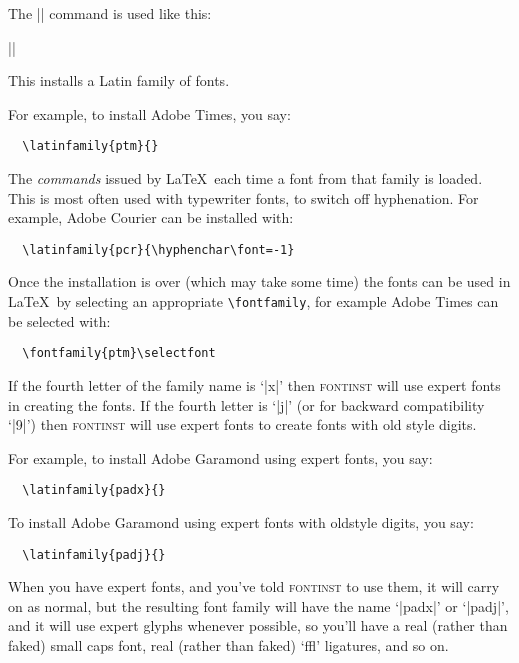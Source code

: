 \documentclass[a4paper]{ltxguide}
\newcommand*{\setpackagename}[1]{\textsc{#1}}
\newcommand{\fontinst}{\setpackagename{font\-inst}\xspace}
\begin{document}

The |\latinfamily| command is used like this:
\begin{decl}
  |\latinfamily|
\end{decl}
This installs a Latin family of fonts.

For example, to install Adobe Times, you say:
\begin{verbatim}
  \latinfamily{ptm}{}
\end{verbatim}
The \textit{commands} issued by \LaTeX\ each time a font from that
family is loaded.  This is most often used with typewriter fonts,
to switch off hyphenation.  For example, Adobe Courier can be
installed with:
\begin{verbatim}
  \latinfamily{pcr}{\hyphenchar\font=-1}
\end{verbatim}
Once the installation is over (which may take some time) the fonts
can be used in \LaTeX\ by selecting an appropriate
\verb|\fontfamily|, for example Adobe Times can be selected with:
\begin{verbatim}
  \fontfamily{ptm}\selectfont
\end{verbatim}
If the fourth letter of the family name is `|x|' then \fontinst
will use expert fonts in creating the fonts.  If the fourth letter
is `|j|' (or for backward compatibility `|9|') then \fontinst will
use expert fonts to create fonts with old style digits.

For example, to install Adobe Garamond using expert fonts, you say:
\begin{verbatim}
  \latinfamily{padx}{}
\end{verbatim}
To install Adobe Garamond using expert fonts with oldstyle digits,
you say:
\begin{verbatim}
  \latinfamily{padj}{}
\end{verbatim}

When you have expert fonts, and you've told \fontinst to use
them, it will carry on as normal, but the resulting font family
will have the name `|padx|' or `|padj|', and it will use expert
glyphs whenever possible, so you'll have a real (rather than
faked) small caps font, real (rather than faked) `ffl' ligatures,
and so on.
\end{document}
